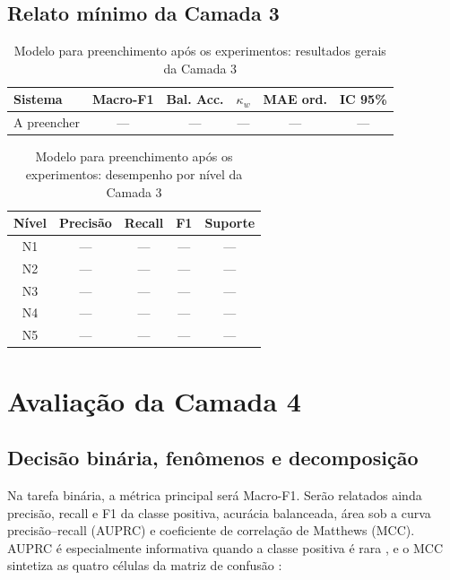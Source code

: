 \subsection{Relato mínimo da Camada 3}

\begin{table}[htbp]
\centering
\caption{Modelo para preenchimento após os experimentos: resultados gerais da Camada 3}
\label{tab:resultados-gerais-c3}
\begin{tabular}{|l|c|c|c|c|c|}
\hline
\textbf{Sistema} & \textbf{Macro-F1} & \textbf{Bal. Acc.} & \textbf{\(\kappa_w\)} & \textbf{MAE ord.} & \textbf{IC 95\%} \\
\hline
A preencher & --- & --- & --- & --- & --- \\
\hline
\end{tabular}
\end{table}

\begin{table}[htbp]
\centering
\caption{Modelo para preenchimento após os experimentos: desempenho por nível da Camada 3}
\label{tab:resultados-classe-c3}
\begin{tabular}{|c|c|c|c|c|}
\hline
\textbf{Nível} & \textbf{Precisão} & \textbf{Recall} & \textbf{F1} & \textbf{Suporte} \\
\hline
N1 & --- & --- & --- & --- \\
\hline
N2 & --- & --- & --- & --- \\
\hline
N3 & --- & --- & --- & --- \\
\hline
N4 & --- & --- & --- & --- \\
\hline
N5 & --- & --- & --- & --- \\
\hline
\end{tabular}
\end{table}

\section{Avaliação da Camada 4}
\label{sec:avaliacao-c4}

\subsection{Decisão binária, fenômenos e decomposição}

Na tarefa binária, a métrica principal será Macro-F1. Serão relatados ainda precisão, recall e F1 da classe positiva, acurácia balanceada, área sob a curva precisão--recall (AUPRC) e coeficiente de correlação de Matthews (MCC). AUPRC é especialmente informativa quando a classe positiva é rara \cite{davisgoadrich2006}, e o MCC sintetiza as quatro células da matriz de confusão \cite{matthews1975}:

